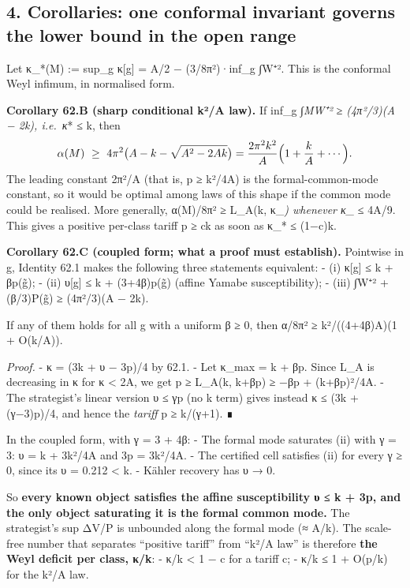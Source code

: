 \documentclass[
  10pt,
]{report}
\begin{document}
\hypertarget{corollaries-one-conformal-invariant-governs-the-lower-bound-in-the-open-range}{%
\subsection{4. Corollaries: one conformal invariant governs the lower
bound in the open
range}\label{corollaries-one-conformal-invariant-governs-the-lower-bound-in-the-open-range}}

Let κ\_*(M) := sup\_g κ{[}g{]} = A/2 − (3/8π²)·inf\_g
∫\textbar W⁺\textbar². This is the conformal Weyl infimum, in normalised
form.

\textbf{Corollary 62.B (sharp conditional k²/A law).} If inf\_g
∫\emph{M\textbar W⁺\textbar² ≥ (4π²/3)(A − 2k), i.e.~κ}* ≤ k, then \[
\alpha(M)\ \ge\ 4\pi^2\bigl(A-k-\sqrt{A^2-2Ak}\bigr)=\frac{2\pi^2k^2}{A}\Bigl(1+\frac kA+\cdots\Bigr).
\] The leading constant 2π²/A (that is, p ≥ k²/4A) is the
formal-common-mode constant, so it would be optimal among laws of this
shape if the common mode could be realised. More generally, α(M)/8π² ≥
L\_A(k, κ\_\emph{) whenever κ\_} ≤ 4A/9. This gives a positive per-class
tariff p ≥ ck as soon as κ\_* ≤ (1−c)k.

\textbf{Corollary 62.C (coupled form; what a proof must establish).}
Pointwise in g, Identity 62.1 makes the following three statements
equivalent: - (i) κ{[}g{]} ≤ k + βp(g̃); - (ii) υ{[}g{]} ≤ k + (3+4β)p(g̃)
(affine Yamabe susceptibility); - (iii) ∫\textbar W⁺\textbar² +
(β/3)P(g̃) ≥ (4π²/3)(A − 2k).

If any of them holds for all g with a uniform β ≥ 0, then α/8π² ≥
k²/((4+4β)A)(1 + O(k/A)).

\emph{Proof.} - κ = (3k + υ − 3p)/4 by 62.1. - Let κ\_max = k + βp.
Since L\_A is decreasing in κ for κ \textless{} 2A, we get p ≥ L\_A(k,
k+βp) ≥ −βp + (k+βp)²/4A. - The strategist's linear version υ ≤ γp (no k
term) gives instead κ ≤ (3k + (γ−3)p)/4, and hence the \emph{tariff} p ≥
k/(γ+1). ∎

In the coupled form, with γ = 3 + 4β: - The formal mode saturates (ii)
with γ = 3: υ = k + 3k²/4A and 3p = 3k²/4A. - The certified cell
satisfies (ii) for every γ ≥ 0, since its υ = 0.212 \textless{} k. -
Kähler recovery has υ → 0.

So \textbf{every known object satisfies the affine susceptibility υ ≤ k
+ 3p, and the only object saturating it is the formal common mode.} The
strategist's sup ΔV/P is unbounded along the formal mode (≈ A/k). The
scale-free number that separates ``positive tariff'' from ``k²/A law''
is therefore \textbf{the Weyl deficit per class, κ/k}: - κ/k \textless{}
1 − c for a tariff c; - κ/k ≤ 1 + O(p/k) for the k²/A law.
\end{document}

